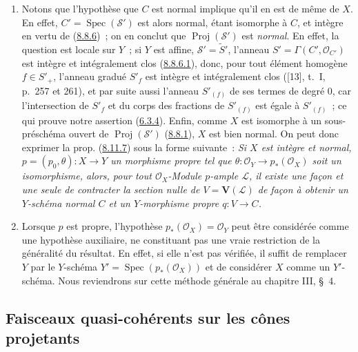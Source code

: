 \begin{remark}[8.11.8]
\label{II.8.11.8-fr}
\begin{enumerate}
  \item[\rm{(i)}] Notons que l'hypothèse que $C$ est normal implique qu'il en
  est de même de $X$. En effet, $C'=\operatorname{Spec}(\mathcal{S}')$ est
  alors normal, étant isomorphe à $C$, et intègre en vertu de
  (\hyperref[II.8.8.6-fr]{8.8.6})~; on en conclut que
  $\operatorname{Proj}(\mathcal{S}')$ est \emph{normal}. En effet, la question
  est locale sur $Y$~; si $Y$ est affine, $\mathcal{S}'=\widetilde{S}'$,
  l'anneau $S'=\Gamma(C',\mathcal{O}_{C'})$ est intègre et intégralement clos
  (\hyperref[II.8.8.6.1-fr]{8.8.6.1}), donc, pour tout élément homogène
  $f\in S'_+$, l'anneau gradué $S'_f$ est intègre et intégralement clos
  ([13], t.~I, p.~257 et 261), et par suite aussi l'anneau $S'_{(f)}$ de ses
  termes de degré 0, car l'intersection de $S'_f$ et du corps des fractions de
  $S'_{(f)}$ est égale à $S'_{(f)}$~; ce qui prouve notre assertion
  (\hyperref[II.6.3.4-fr]{6.3.4}). Enfin, comme $X$ est isomorphe à un
  sous-préschéma ouvert de $\operatorname{Proj}(\mathcal{S}')$
  (\hyperref[II.8.8.1-fr]{8.8.1}), $X$ est bien normal. On peut donc exprimer
  la prop. (\hyperref[II.8.11.7-fr]{8.11.7}) sous la forme suivante~:
  \emph{Si $X$ est intègre et normal,
  $p=(p_0,\theta):X\to Y$ un morphisme propre tel que
  $\theta:\mathcal{O}_Y\to p_*(\mathcal{O}_X)$ soit un isomorphisme, alors,
  pour tout $\mathcal{O}_X$-Module $p$-ample $\mathcal{L}$, il existe une
  façon et une seule de contracter la section nulle de
  $V=\mathbf{V}(\mathcal{L})$ de façon à obtenir un $Y$-schéma normal $C$ et
  un $Y$-morphisme propre $q:V\to C$.}
  \item[\rm{(ii)}] Lorsque $p$ est propre, l'hypothèse
  $p_*(\mathcal{O}_X)=\mathcal{O}_Y$ peut être considérée comme une hypothèse
  auxiliaire, ne constituant pas une vraie restriction de la généralité du
  résultat. En effet, si elle n'est pas vérifiée, il suffit de remplacer $Y$
  par le $Y$-schéma
  $Y'=\operatorname{Spec}(p_*(\mathcal{O}_X))$ et de considérer $X$ comme un
  $Y'$-schéma. Nous reviendrons sur cette méthode générale au chapitre III,
  \S~4.
\end{enumerate}
\end{remark}
\subsection{Faisceaux quasi-cohérents sur les cônes projetants}
\label{subsection:II.8.12-fr}

